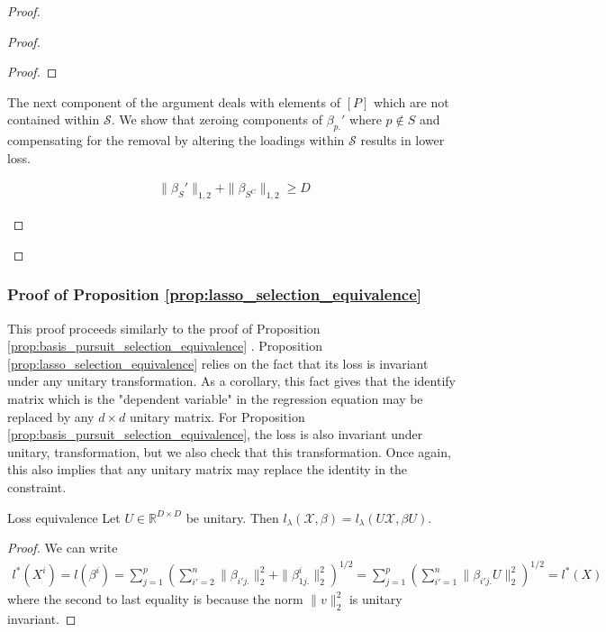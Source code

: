 \begin{proof}
\begin{proof}
\begin{proof}
\end{proof}

The next component of the argument deals with elements of $[P]$ which are not contained within $\mathcal S$.
We show that zeroing components of $\beta_{p.}'$ where $p \not \in S$ and compensating for the removal by altering the loadings within $\mathcal S$ results in lower loss.


\begin{proposition}
\begin{align}
\|\beta_{S}'\|_{1,2} + \|\beta_{S^C}\|_{1,2} \geq D
\end{align}
\end{proposition}
\end{proof}

\end{proof}
\subsubsection{Proof of Proposition \ref{prop:lasso_selection_equivalence} }

This proof proceeds similarly to the proof of Proposition  \ref{prop:basis_pursuit_selection_equivalence} .
Proposition \ref{prop:lasso_selection_equivalence} relies on the fact that its loss is invariant under any unitary transformation.
As a corollary, this fact gives that the identify matrix which is the "dependent variable" in the regression equation may be replaced by any $d \times d$ unitary matrix.
For Proposition \ref{prop:basis_pursuit_selection_equivalence}, the loss is also invariant under unitary, transformation, but we also check that this transformation.
Once again, this also implies that any unitary matrix may replace the identity in the constraint.

 \begin{proposition}{Loss equivalence}
 \label{prop:lasso_loss_equivalence}
 Let $U \in \mathbb R^{D \times D}$ be unitary.
 Then $l_\lambda (\mathcal X, \beta) = l_\lambda (U \mathcal X, \beta U)$.
\end{proposition}

\begin{proof}
We can write 
\begin{eqnarray}
l^*(X^i) = l(\beta^i) = \sum_{j = 1}^p (\sum_{i'=2}^n \| \beta_{i'j.} \|_2^2 +  \|  \beta_{1j.}^i \|_2^2 )^{1/2}=  \sum_{j = 1}^p (\sum_{i'=1}^n \| \beta_{i'j.} U \|_2^2)^{1/2} = l^*(X)
\end{eqnarray}
where the second to last equality is because the norm $\|v\|_2^2 $ is unitary invariant.

\end{proof}


